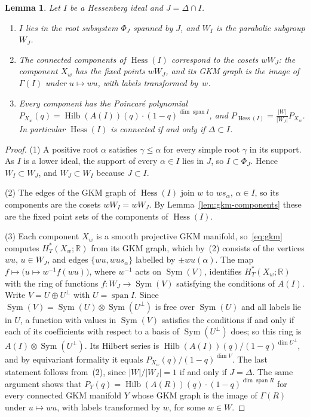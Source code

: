 \documentclass[11pt,a4paper]{article}
\numberwithin{equation}{section}
\theoremstyle{plain}
\newtheorem{lemma}[theorem]{Lemma}
\theoremstyle{definition}
\theoremstyle{remark}
\newcommand{\R}{\mathbb{R}}
\newcommand{\HT}{H^{*}_{T}}
\DeclareMathOperator{\Hess}{Hess}
\DeclareMathOperator{\Sym}{Sym}
\DeclareMathOperator{\spn}{span}
\DeclareMathOperator{\Hilb}{Hilb}
\begin{document}
\begin{lemma}\label{lem:hess-components}
Let $I$ be a Hessenberg ideal and $J=\Delta\cap I$.
\begin{enumerate}[nosep,label=(\arabic*)]
\item $I$ lies in the root subsystem $\Phi_J$ spanned by $J$, and $W_I$ is the parabolic subgroup $W_J$.
\item The connected components of $\Hess(I)$ correspond to the cosets $wW_J$: the component $X_w$ has the fixed points $wW_J$, and its GKM graph is the image of $\Gamma(I)$ under $u\mapsto wu$, with labels transformed by~$w$.
\item Every component has the Poincaré polynomial $P_{X_w}(q)=\Hilb(A(I))(q)\cdot(1-q)^{\dim\spn I}$, and $P_{\Hess(I)}=\frac{|W|}{|W_J|}P_{X_w}$. In particular $\Hess(I)$ is connected if and only if $\Delta\subset I$.
\end{enumerate}
\end{lemma}

\begin{proof}
(1) A positive root $\alpha$ satisfies $\gamma\leqslant\alpha$ for every simple root $\gamma$ in its support. As $I$ is a lower ideal, the support of every $\alpha\in I$ lies in $J$, so $I\subset\Phi_J$. Hence $W_I\subset W_J$, and $W_J\subset W_I$ because $J\subset I$.

(2) The edges of the GKM graph of $\Hess(I)$ join $w$ to $ws_\alpha$, $\alpha\in I$, so its components are the cosets $wW_I=wW_J$. By Lemma~\ref{lem:gkm-components} these are the fixed point sets of the components of $\Hess(I)$.

(3) Each component $X_w$ is a smooth projective GKM manifold, so~\eqref{eq:gkm} computes $\HT(X_w;\R)$ from its GKM graph, which by~(2) consists of the vertices $wu$, $u\in W_J$, and edges $\{wu,wus_\alpha\}$ labelled by $\pm wu(\alpha)$. The map $f\mapsto\bigl(u\mapsto w^{-1}f(wu)\bigr)$, where $w^{-1}$ acts on $\Sym(V)$, identifies $\HT(X_w;\R)$ with the ring of functions $f\colon W_J\to\Sym(V)$ satisfying the conditions of $A(I)$. Write $V=U\oplus U^\perp$ with $U=\spn I$. Since $\Sym(V)=\Sym(U)\otimes\Sym(U^\perp)$ is free over $\Sym(U)$ and all labels lie in $U$, a function with values in $\Sym(V)$ satisfies the conditions if and only if each of its coefficients with respect to a basis of $\Sym(U^\perp)$ does; so this ring is $A(I)\otimes\Sym(U^\perp)$. Its Hilbert series is $\Hilb(A(I))(q)/(1-q)^{\dim U^\perp}$, and by equivariant formality it equals $P_{X_w}(q)/(1-q)^{\dim V}$. The last statement follows from~(2), since $|W|/|W_J|=1$ if and only if $J=\Delta$. The same argument shows that $P_Y(q)=\Hilb(A(R))(q)\cdot(1-q)^{\dim\spn R}$ for every connected GKM manifold $Y$ whose GKM graph is the image of $\Gamma(R)$ under $u\mapsto wu$, with labels transformed by $w$, for some $w\in W$.
\end{proof}
\end{document}
